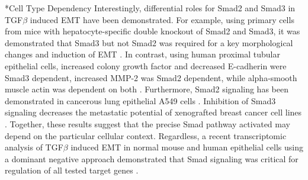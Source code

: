 \documentclass[12pt]{article}
\makeatletter
\renewcommand\subsubsection{\@startsection
	{subsubsection}{2}{0mm}
	{-0.05in}
	{-0.5\baselineskip}
	{\normalfont\normalsize\itshape}}
\makeatother
\begin{document}
\subsubsection*{Cell Type Dependency} Interestingly, differential roles for Smad2 and Smad3 in TGF$\beta$ induced EMT have been demonstrated.
For example, using primary cells from mice with hepatocyte-specific double knockout of Smad2 and Smad3, it was demonstrated that Smad3 but not Smad2 was required for a key morphological changes and induction of EMT \cite{Ju:2006so}.
In contrast, using human proximal tubular epithelial cells, increased colony growth factor and decreased E-cadherin were Smad3 dependent, increased MMP-2 was Smad2 dependent, while alpha-smooth muscle actin was dependent on both \cite{Phanish2006}.
Furthermore, Smad2 signaling has been demonstrated in cancerous lung epithelial A549 cells \cite{Kasai2005}.
Inhibition of Smad3 signaling decreases the metastatic potential of xenografted breast cancer cell lines \cite{Tian2003,Tian2004}.
Together, these results suggest that the precise Smad pathway activated may depend on the particular cellular context.
Regardless, a recent transcriptomic analysis of TGF$\beta$ induced EMT in normal mouse and human epithelial cells using a dominant negative approach demonstrated that Smad signaling was critical for regulation of all tested target genes \cite{Valcourt2005}.
\end{document}
